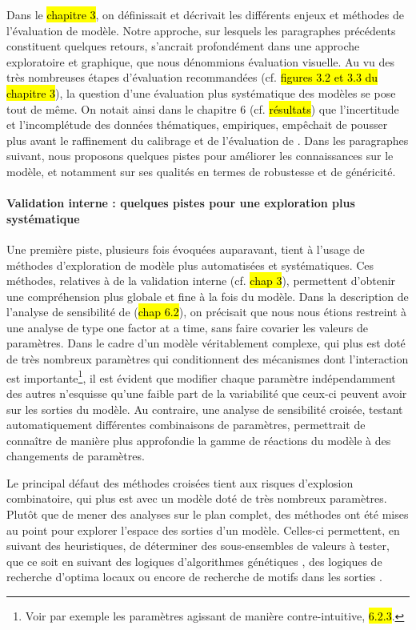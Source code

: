 Dans le \hl{chapitre 3}, on définissait et décrivait les différents enjeux et méthodes de l'évaluation de modèle.
Notre approche, sur lesquels les paragraphes précédents constituent quelques retours, s'ancrait profondément dans une approche exploratoire et graphique, que nous dénommions \og évaluation visuelle\fg{}.
Au vu des très nombreuses étapes d'évaluation recommandées (cf. \hl{figures 3.2 et 3.3 du chapitre 3}), la question d'une évaluation plus systématique des modèles se pose tout de même.
On notait ainsi dans le chapitre 6 (cf. \hl{résultats}) que l'incertitude et l'incomplétude des données thématiques, empiriques, empêchait de pousser plus avant le raffinement du calibrage et de l'évaluation de \simfeodal{}.
Dans les paragraphes suivant, nous proposons quelques pistes pour améliorer les connaissances sur le modèle, et notamment sur ses qualités en termes de robustesse et de généricité.

\paragraph{Validation interne : quelques pistes pour une exploration plus systématique}
Une première piste, plusieurs fois évoquées auparavant, tient à l'usage de méthodes d'exploration de modèle plus automatisées et systématiques.
Ces méthodes, relatives à de la validation interne (cf. \hl{chap 3}), permettent d'obtenir une compréhension plus globale et fine à la fois du modèle.
Dans la description de l'analyse de sensibilité de \simfeodal{} (\hl{chap 6.2}), on précisait que nous nous étions restreint à une analyse de type \og one factor at a time\fg{}, sans faire covarier les valeurs de paramètres.
Dans le cadre d'un modèle véritablement complexe, qui plus est doté de très nombreux paramètres qui conditionnent des mécanismes dont l'interaction est importante\footnote{
 Voir par exemple les paramètres agissant de manière contre-intuitive, \hl{6.2.3}.
}, il est évident que modifier chaque paramètre indépendamment des autres n'esquisse qu'une faible part de la variabilité que ceux-ci peuvent avoir sur les sorties du modèle.
Au contraire, une analyse de sensibilité croisée, testant automatiquement différentes combinaisons de paramètres, permettrait de connaître de manière plus approfondie la gamme de réactions du modèle à des changements de paramètres.

\noindent Le principal défaut des méthodes croisées tient aux risques d'explosion combinatoire, qui plus est avec un modèle doté de très nombreux paramètres.
Plutôt que de mener des analyses sur le plan complet, des méthodes ont été mises au point pour explorer l'espace des sorties d'un modèle.
Celles-ci permettent, en suivant des heuristiques, de déterminer des sous-ensembles de valeurs à tester, que ce soit en suivant des logiques d'algorithmes génétiques \autocite{schmitt_half_2015,rey-coyrehourcq_plateforme_2015}, des logiques de recherche d'optima locaux \autocite{schmitt_modelisation_2014, reuillon_new_2015} ou encore de recherche de motifs dans les sorties \autocite{cherel_beyond_2015}.

